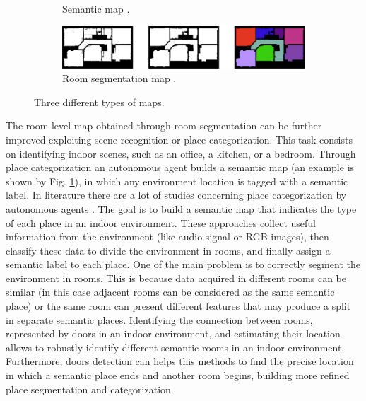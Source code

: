 \begin{figure}[h!]
\begin{subfigure}[b]{0.45\linewidth}
		\caption{Semantic map \cite{placecategorization}.}
		\label{fig:semantic_map}
	\end{subfigure}
	\newline
	\newline
	\begin{subfigure}[b]{0.99\linewidth}
		\centering
		\includegraphics[width=\textwidth]{images/roomsegmentation.png}
		\caption{Room segmentation map \cite{segmentation3d}.}
		\label{fig:room_segmentation_map}
	\end{subfigure}
	\caption{Three different types of maps.}
	
\end{figure}

The room level map obtained through room segmentation can be further improved exploiting scene recognition or place categorization. This task consists on identifying indoor scenes, such as an office, a kitchen, or a bedroom. Through place categorization an autonomous agent builds a semantic map (an example is shown by Fig. \ref{fig:semantic_map}), in which any environment location is tagged with a semantic label. In literature there are a lot of studies concerning place categorization by autonomous agents \cite{scenerecognitionaudio, scenerecognitiononjectdetection, placecategorization, placecategorizationlargescale}. The goal is to build a semantic map that indicates the type of each place in an indoor environment. These approaches collect useful information from the environment (like audio signal or RGB images), then classify these data to divide the environment in rooms, and finally assign a semantic label to each place. One of the main problem is to correctly segment the environment in rooms. This is because data acquired in different rooms can be similar (in this case adjacent rooms can be considered as the same semantic place) or the same room can present different features that may produce a split in separate semantic places. Identifying the connection between rooms, represented by doors in an indoor environment, and estimating their location allows to robustly identify different semantic rooms in an indoor environment. Furthermore, doors detection can helps this methods to find the precise location in which a semantic place ends and another room begins, building more refined place segmentation and categorization.  

